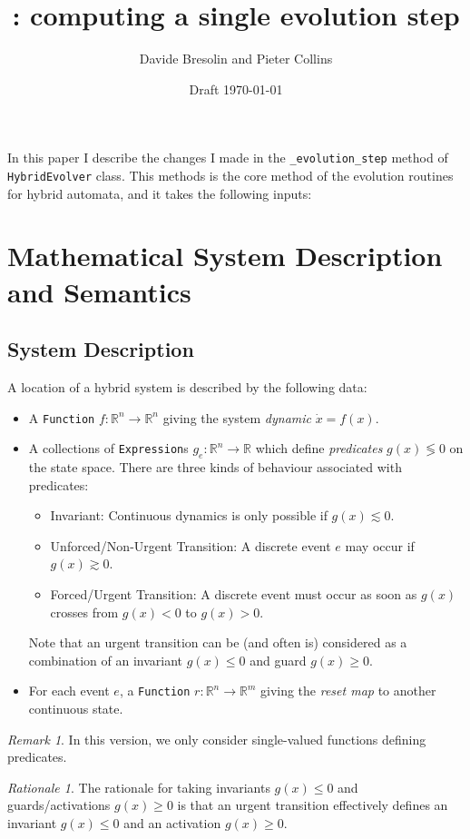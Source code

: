 \documentclass[english,a4paper]{article}
\title{\ARIADNE: computing a single evolution step}
\author{Davide Bresolin and Pieter Collins}
\date{Draft \today}
\newcommand{\R}{\mathbb{R}}
\theoremstyle{theorem}
\theoremstyle{definition}
\theoremstyle{remark}
\newtheorem*{remark*}{Remark}
\newtheorem*{rationale*}{Rationale}
\begin{document}
\maketitle

\noindent In this paper I describe the changes I made in the \texttt{\_evolution\_step} method of \texttt{HybridEvolver} class. This methods is the core method of the evolution routines for hybrid automata, and it takes the following inputs:

\section{Mathematical System Description and Semantics}

\subsection*{System Description}

A location of a hybrid system is described by the following data:
\begin{itemize}
\item A \texttt{Function} $f:\R^n \rightarrow \R^n$ giving the system \emph{dynamic} $\dot{x}=f(x)$.
\item A collections of \texttt{Expression}s $g_e:\R^n\rightarrow \R$ which define \emph{predicates} $g(x)\lessgtr 0$ on the state space.
There are three kinds of behaviour associated with predicates:
 \begin{itemize}
  \item Invariant: Continuous dynamics is only possible if $g(x)\lesssim 0$.
  \item Unforced/Non-Urgent Transition: A discrete event $e$ may occur if $g(x)\gtrsim0$.
  \item Forced/Urgent Transition: A discrete event must occur as soon as $g(x)$ crosses from $g(x)<0$ to $g(x)>0$.
 \end{itemize}
Note that an urgent transition can be (and often is) considered as a combination of an invariant $g(x)\leq0$ and guard $g(x)\geq0$.
\item For each event $e$, a \texttt{Function} $r:\R^n\rightarrow\R^m$ giving the \emph{reset map} to another continuous state.
\end{itemize}
\begin{remark*}
In this version, we only consider single-valued functions defining predicates.
\end{remark*}

\begin{rationale*}
The rationale for taking invariants $g(x)\leq 0$ and guards/activations $g(x)\geq0$ is that an urgent transition effectively defines an invariant $g(x)\leq0$ and an activation $g(x)\geq0$.
\end{rationale*}
\end{document}
